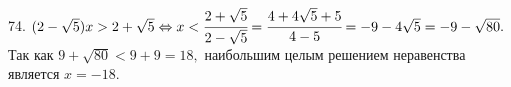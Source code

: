 74. $(2-\sqrt{5})x>2+\sqrt{5}\Leftrightarrow x<\cfrac{2+\sqrt{5}}{2-\sqrt{5}}=\cfrac{4+4\sqrt{5}+5}{4-5}=-9-4\sqrt{5}=-9-\sqrt{80}.$ Так как $9+\sqrt{80}<9+9=18,$
наибольшим целым решением неравенства является $x=-18.$\\
